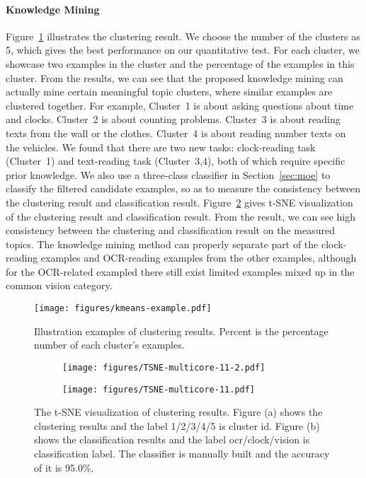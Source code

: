 \paragraph{Knowledge Mining}
Figure~\ref{fig:kmeans_example} illustrates the clustering result. We choose the number of the clusters as 5, which gives the best performance on our quantitative test. For each cluster, we showcase two examples in the cluster and the percentage of the examples in this cluster. From the results, we can see that the proposed knowledge mining can actually mine certain meaningful topic clusters, where similar examples are clustered together. For example, Cluster~1 is about asking questions about time and clocks. Cluster~2 is about counting problems. Cluster~3 is about reading texts from the wall or the clothes. Cluster~4 is about reading number texts on the vehicles. We found that there are two new tasks: clock-reading task (Cluster~1) and text-reading task (Cluster~3,4), both of which require specific prior knowledge. We also use a three-class classifier in Section~\ref{sec:moe} to classify the filtered candidate examples, so as to measure the consistency between the clustering result and classification result.
Figure~\ref{fig:tsne} gives t-SNE visualization of the clustering result and classification result. From the result, we can see high consistency between the clustering and classification result on the measured topics. The knowledge mining method can properly separate part of the clock-reading examples and OCR-reading examples from the other examples, although for the OCR-related exampled there still exist limited examples mixed up in the common vision category.

\begin{figure} \centering
    \texttt{[image: figures/kmeans-example.pdf]}
    \caption{Illustration examples of clustering results. Percent is the percentage number of each cluster's examples.}
    \label{fig:kmeans_example}
\end{figure}

\begin{figure} \centering
    \begin{subfigure}[]{}
         \centering
         \texttt{[image: figures/TSNE-multicore-11-2.pdf]}
\end{subfigure}
     \hfill
     \begin{subfigure}[]{}
         \centering
         \texttt{[image: figures/TSNE-multicore-11.pdf]}
     \end{subfigure}
    \caption{The t-SNE visualization of clustering results. Figure (a) shows the clustering results and the label 1/2/3/4/5 is cluster id. Figure (b) shows the classification results and the label ocr/clock/vision is classification label. The classifier is manually built and the accuracy of it is 95.0\%.}
    \label{fig:tsne}
\end{figure}


